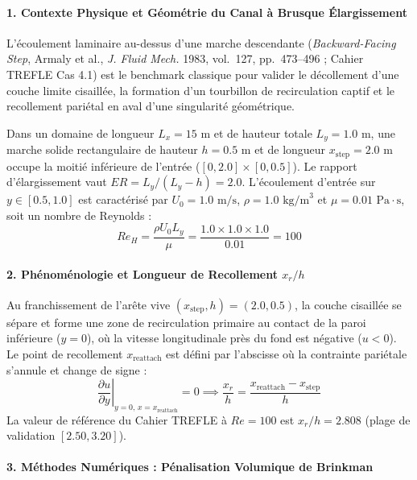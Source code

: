 \documentclass[
  10pt,
]{article}
\begin{document}
\paragraph{1. Contexte Physique et Géométrie du Canal à Brusque
Élargissement}\label{contexte-physique-et-guxe9omuxe9trie-du-canal-uxe0-brusque-uxe9largissement}

L'écoulement laminaire au-dessus d'une marche descendante
(\emph{Backward-Facing Step}, Armaly et al., \emph{J. Fluid Mech.} 1983,
vol.~127, pp.~473--496 ; Cahier TREFLE Cas 4.1) est le benchmark
classique pour valider le décollement d'une couche limite cisaillée, la
formation d'un tourbillon de recirculation captif et le recollement
pariétal en aval d'une singularité géométrique.

Dans un domaine de longueur \(L_x = 15\text{ m}\) et de hauteur totale
\(L_y = 1.0\text{ m}\), une marche solide rectangulaire de hauteur
\(h = 0.5\text{ m}\) et de longueur \(x_{\text{step}} = 2.0\text{ m}\)
occupe la moitié inférieure de l'entrée (\([0, 2.0] \times [0, 0.5]\)).
Le rapport d'élargissement vaut \(ER = L_y / (L_y - h) = 2.0\).
L'écoulement d'entrée sur \(y \in [0.5, 1.0]\) est caractérisé par
\(U_0 = 1.0\text{ m/s}\), \(\rho = 1.0\text{ kg/m}^3\) et
\(\mu = 0.01\text{ Pa}\cdot\text{s}\), soit un nombre de Reynolds :
\[Re_H = \frac{\rho U_0 L_y}{\mu} = \frac{1.0 \times 1.0 \times 1.0}{0.01} = 100\]

\paragraph{\texorpdfstring{2. Phénoménologie et Longueur de Recollement
\(x_r / h\)}{2. Phénoménologie et Longueur de Recollement x\_r / h}}\label{phuxe9nomuxe9nologie-et-longueur-de-recollement-x_r-h}

Au franchissement de l'arête vive \((x_{\text{step}}, h) = (2.0, 0.5)\),
la couche cisaillée se sépare et forme une zone de recirculation
primaire au contact de la paroi inférieure (\(y = 0\)), où la vitesse
longitudinale près du fond est négative (\(u < 0\)). Le point de
recollement \(x_{\text{reattach}}\) est défini par l'abscisse où la
contrainte pariétale s'annule et change de signe :
\[\left.\frac{\partial u}{\partial y}\right|_{y=0, \, x = x_{\text{reattach}}} = 0 \implies \frac{x_r}{h} = \frac{x_{\text{reattach}} - x_{\text{step}}}{h}\]
La valeur de référence du Cahier TREFLE à \(Re=100\) est
\(x_r / h = 2.808\) (plage de validation \([2.50, 3.20]\)).

\paragraph{3. Méthodes Numériques : Pénalisation Volumique de
Brinkman}\label{muxe9thodes-numuxe9riques-puxe9nalisation-volumique-de-brinkman}
\end{document}
